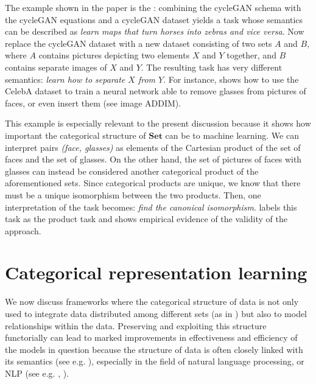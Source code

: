 \documentclass[11pt,a4paper,openright,twoside]{report}
\theoremstyle{plain}
\theoremstyle{definition}
\begin{document}
The example shown in the paper is the \cite{gavranovic2019compositional}: combining the cycleGAN schema with the cycleGAN equations and a cycleGAN dataset yields a task whose semantics can be described as \textit{learn maps that turn horses into zebras and vice versa}. Now replace the cycleGAN dataset with a new dataset consisting of two sets $A$ and $B$, where $A$ contains pictures depicting two elements $X$ and $Y$ together, and $B$ contains separate images of $X$ and $Y$. The resulting task has very different semantics: \textit{learn how to separate $X$ from $Y$}. For instance, \cite{gavranovic2019compositional} shows how to use the CelebA dataset to train a neural network able to remove glasses from pictures of faces, or even insert them (see image ADDIM).


This example is especially relevant to the present discussion because it shows how important the categorical structure of $\mathbf{Set}$ can be to machine learning. We can interpret pairs \textit{(face, glasses)} as elements of the Cartesian product of the set of faces and the set of glasses. On the other hand, the set of pictures of faces with glasses can instead be considered another categorical product of the aforementioned sets. Since categorical products are unique, we know that there must be a unique isomorphism between the two products. Then, one interpretation of the task becomes: \textit{find the canonical isomorphism}. \cite{gavranovic2019compositional} labels this task as the product task and shows empirical evidence of the validity of the approach.





\section{Categorical representation learning}



We now discuss frameworks where the categorical structure of data is not only used to integrate data distributed among different sets (as in \cite{gavranovic2019compositional}) but also to model relationships within the data. Preserving and exploiting this structure functorially can lead to marked improvements in effectiveness and efficiency of the models in question  because the structure of data is often closely linked with its semantics (see e.g. \cite{sheshmani2021categorical}), especially in the field of natural language processing, or NLP (see e.g. \cite{coecke2010mathematical}, \cite{lewis2019compositionality}). 
\end{document}
